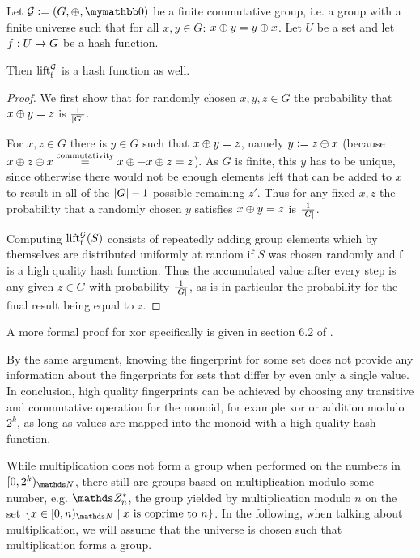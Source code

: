 \begin{proposition}
Let $\mathcal{G} \defeq (G, \groupaddsym, \neutraladd)$ be a finite commutative group, i.e. a group with a finite universe such that for all $x, y \in G$: ${x} \oplus {y} = {y} \oplus {x}$. Let $U$ be a set and let ${f}: {U} \rightarrow {G}$ be a hash function.

Then $\operatorname{lift_{\operatorname{f}}^{\mathcal{G}}}$ is a hash function as well.

\begin{proof}
We first show that for randomly chosen $x, y, z \in G$ the probability that ${x} \oplus {y} = z$ is $\frac{1}{|{G}|}$.

For $x, z \in G$ there is $y \in G$ such that ${x} \oplus {y} = z$, namely $y \vcentcolon= {z} \ominus {x}$ (because ${x} \oplus {{z} \ominus {x}} \overset{\text{commutativity}}= {{x} \oplus {-{x}}} \oplus {z} = z$). As $G$ is finite, this $y$ has to be unique, since otherwise there would not be enough elements left that can be added to $x$ to result in all of the $|{G}| - 1$ possible remaining $z'$. Thus for any fixed $x, z$ the probability that a randomly chosen $y$ satisfies ${x} \oplus {y} = z$ is $\frac{1}{|{G}|}$.

Computing $\operatorname{lift_{\operatorname{f}}^{\mathcal{G}}}(S)$ consists of repeatedly adding group elements which by themselves are distributed uniformly at random if $S$ was chosen randomly and $\operatorname{f}$ is a high quality hash function. Thus the accumulated value after every step is any given $z \in G$ with probability $\frac{1}{|{G}|}$, as is in particular the probability for the final result being equal to $z$.
\end{proof}

A more formal proof for xor specifically is given in section 6.2 of \cite{maziarz2021hashing}.
\end{proposition}

By the same argument, knowing the fingerprint for some set does not provide any information about the fingerprints for sets that differ by even only a single value. In conclusion, high quality fingerprints can be achieved by choosing any transitive and commutative operation for the monoid, for example xor or addition modulo $2^k$, as long as values are mapped into the monoid with a high quality hash function.

While multiplication does not form a group when performed on the numbers in $\range{0}{2^k}{\N}$, there still are groups based on multiplication modulo some number, e.g. $\Z_n^\ast$, the group yielded by multiplication modulo $n$ on the set $\set{x \in \range{0}{n}{\N} \mid \text{$x$ is coprime to $n$}}$. In the following, when talking about multiplication, we will assume that the universe is chosen such that multiplication forms a group.

